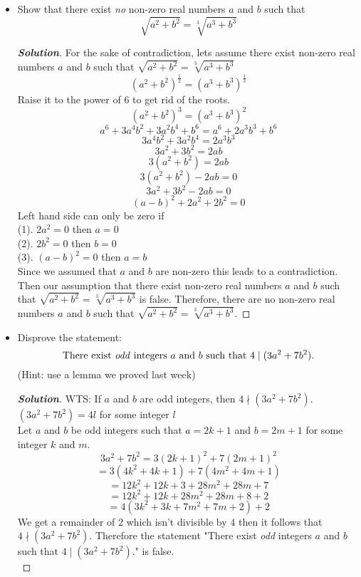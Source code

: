 \documentclass[11pt]{article}
\newenvironment{problem}[2][Problem\!]{\begin{trivlist}
\item[\hskip \labelsep {\bfseries #1}\hskip \labelsep {\bfseries #2.}]}{\end{trivlist}}
\newenvironment{solution}{\begin{proof}[\textbf{\textit{Solution}}]}{\end{proof}}
\begin{document}
\begin{problem}{5.3}\hfill
\begin{itemize}[itemsep=3em]
\item[(a)] Show that there exist \emph{no} non-zero real numbers $a$ and $b$ such that
\[\sqrt{a^2 + b^2} = \sqrt[3]{a^3 + b^3}\]
\begin{solution}\hfill %
For the sake of contradiction, lets assume there exist non-zero real numbers \(a\) and \(b\) such that \(\sqrt{a^2 + b^2} = \sqrt[3]{a^3 + b^3}\)
\[(a^2+b^2)^\frac{1}{2} = (a^3+b^3)^\frac{1}{3}\]
Raise it to the power of 6 to get rid of the roots.
\[(a^2+b^2)^3 = (a^3+b^3)^2\]
\[a^6+3a^4b^2+3a^2b^4+b^6 = a^6+2a^3b^3+b^6\]
\[3a^4b^2+3a^2b^4 = 2a^3b^3\]
\[3a^2+3b^2=2ab\]
\[3(a^2+b^2)=2ab\]
\[3(a^2+b^2)-2ab=0\]
\[3a^2+3b^2-2ab=0\]
\[(a-b)^2+2a^2+2b^2=0\]
Left hand side can only be zero if \\
(1). \(2a^2 = 0\) then \(a = 0\)\\
(2). \(2b^2 = 0\) then \(b = 0\)\\
(3). \((a-b)^2 = 0\) then \(a = b\)\\
Since we assumed that \(a\) and \(b\) are non-zero this leads to a contradiction.
Then our assumption that there exist non-zero real numbers \(a\) and \(b\) such that \(\sqrt{a^2 + b^2} = \sqrt[3]{a^3 + b^3}\) is false. Therefore, there are no non-zero real numbers \(a\) and \(b\) such that \(\sqrt{a^2 + b^2} = \sqrt[3]{a^3 + b^3}\).
\end{solution}

\item[(b)] Disprove the statement: \[\text{There exist \emph{odd} integers $a$ and $b$ such that $4 \mid (3a^2 + 7b^2)$.}\]
(Hint: use a lemma we proved last week)
\begin{solution}\hfill %
WTS: If \(a\) and \(b\) are odd integers, then \(4 \nmid (3a^2+7b^2)\). \\
\((3a^2+7b^2) = 4l\) for some integer \(l\)\\
Let \(a\) and \(b\) be odd integers such that \(a = 2k +1\) and \(b = 2m + 1\) for some integer \(k\) and \(m\).
\[3a^2+7b^2=3(2k+1)^2+7(2m+1)^2\]
\[=3(4k^2+4k+1)+7(4m^2+4m+1)\]
\[=12k^2+12k+3+28m^2+28m+7\]
\[=12k^2+12k+28m^2+28m+8+2\]
\[=4(3k^2+3k+7m^2+7m+2)+2\]
We get a remainder of \(2\) which isn't divisible by \(4\) then it follows that \(4 \nmid (3a^2+7b^2)\). Therefore the statement "There exist \emph{odd} integers $a$ and $b$ such that $4 \mid (3a^2 + 7b^2)$." is false. \\
\end{solution}

\end{itemize}
\end{problem}
\end{document}
